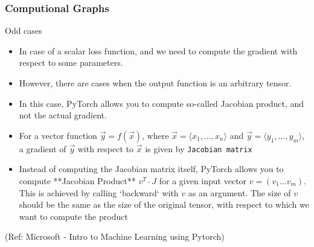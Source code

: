 \begin{frame}[fragile] \frametitle{Computional Graphs}
Odd cases
\begin{itemize}
\item In case of a scalar loss function, and we need to compute the gradient with respect to some parameters. 
\item However, there are cases when the output function is an arbitrary tensor. 
\item In this case, PyTorch allows you to compute so-called Jacobian product, and not the actual gradient.
\item For a vector function $\vec{y}=f(\vec{x})$, where
$\vec{x}=\langle x_1,\dots,x_n\rangle$ and
$\vec{y}=\langle y_1,\dots,y_m\rangle$, a gradient of
$\vec{y}$ with respect to $\vec{x}$ is given by \lstinline|Jacobian matrix|


\item Instead of computing the Jacobian matrix itself, PyTorch allows you to
compute **Jacobian Product** $v^T\cdot J$ for a given input vector
$v=(v_1 \dots v_m)$. This is achieved by calling `backward` with
$v$ as an argument. The size of $v$ should be the same as
the size of the original tensor, with respect to which we want to
compute the product
\end{itemize}


\tiny{(Ref: Microsoft - Intro to Machine Learning using Pytorch)}
\end{frame}


